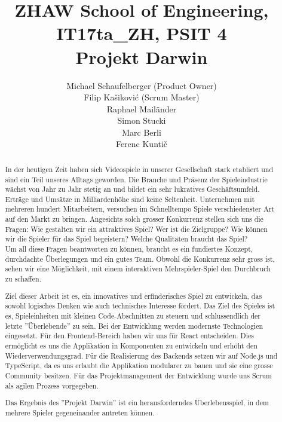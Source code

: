 \documentclass[11pt,a4paper,titlepage]{article}
\author{
Michael Schaufelberger (Product Owner)\\
Filip Kašiković (Scrum Master)\\
Raphael Mailänder\\
Simon Stucki\\
Marc Berli\\
Ferenc Kuntič}
\title{{\small ZHAW School of Engineering, 
IT17ta\_ZH, 
PSIT 4}\\
Projekt Darwin}
\begin{document}
\maketitle

\begin{otherlanguage}{english}
\begin{abstract}

In der heutigen Zeit haben sich Videospiele in unserer Gesellschaft stark etabliert und sind ein Teil unseres Alltags geworden. Die Branche und Präsenz der Spieleindustrie wächst von Jahr zu Jahr stetig an und bildet ein sehr lukratives Geschäftsumfeld. Erträge und Umsätze in Milliardenhöhe sind keine Seltenheit. Unternehmen mit mehreren hundert Mitarbeitern, versuchen im Schnelltempo Spiele verschiedenster Art auf den Markt zu bringen. 
Angesichts solch grosser Konkurrenz stellen sich uns die Fragen: Wie gestalten wir ein attraktives Spiel? Wer ist die Zielgruppe? Wie können wir die Spieler für das Spiel begeistern? Welche Qualitäten braucht das Spiel?
\\Um all diese Fragen beantworten zu können, braucht es ein fundiertes Konzept, durchdachte Überlegungen und ein gutes Team. Obwohl die Konkurrenz sehr gross ist, sehen wir eine Möglichkeit, mit einem interaktiven Mehrspieler-Spiel den Durchbruch zu schaffen.

Ziel dieser Arbeit ist es, ein innovatives und erfinderisches Spiel zu entwickeln, das sowohl logisches Denken wie auch technisches Interesse fördert. Das Ziel des Spieles ist es, Spieleinheiten mit kleinen Code-Abschnitten zu steuern und schlussendlich der letzte ''Überlebende'' zu sein.
Bei der Entwicklung werden modernste Technologien eingesetzt. Für den Frontend-Bereich haben wir uns für React entscheiden. Dies ermöglicht es uns die Applikation in Komponenten zu entwickeln und erhöht den Wiederverwendungsgrad. Für die Realisierung des Backends setzen wir auf Node.js und TypeScript, da es uns erlaubt die Applikation modularer zu bauen und sie eine grosse Community besitzen.
Für das Projektmanagement der Entwicklung wurde uns Scrum als agilen Prozess vorgegeben.

Das Ergebnis des ''Projekt Darwin'' ist ein herausforderndes Überlebensspiel, in dem mehrere Spieler gegeneinander antreten können.

\end{abstract}
\end{otherlanguage}
\end{document}
